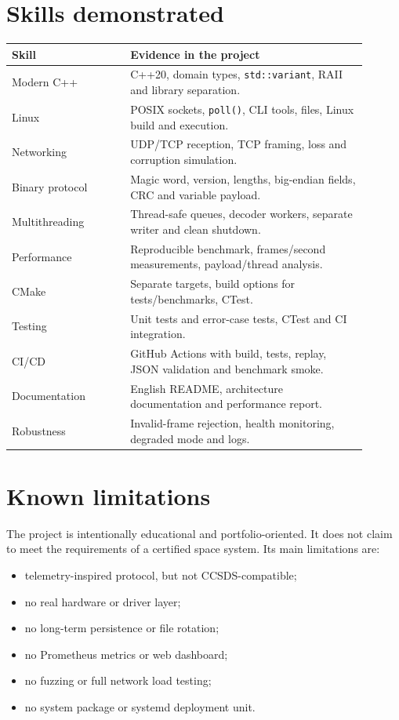 \documentclass[11pt,a4paper]{article}
\newcommand{\code}[1]{\texttt{#1}}
\begin{document}
\section{Skills demonstrated}

\begin{longtable}{p{0.30\linewidth} p{0.60\linewidth}}
\toprule
\textbf{Skill} & \textbf{Evidence in the project} \\
\midrule
Modern C++ & C++20, domain types, \code{std::variant}, RAII and library separation. \\
Linux & POSIX sockets, \code{poll()}, CLI tools, files, Linux build and execution. \\
Networking & UDP/TCP reception, TCP framing, loss and corruption simulation. \\
Binary protocol & Magic word, version, lengths, big-endian fields, CRC and variable payload. \\
Multithreading & Thread-safe queues, decoder workers, separate writer and clean shutdown. \\
Performance & Reproducible benchmark, frames/second measurements, payload/thread analysis. \\
CMake & Separate targets, build options for tests/benchmarks, CTest. \\
Testing & Unit tests and error-case tests, CTest and CI integration. \\
CI/CD & GitHub Actions with build, tests, replay, JSON validation and benchmark smoke. \\
Documentation & English README, architecture documentation and performance report. \\
Robustness & Invalid-frame rejection, health monitoring, degraded mode and logs. \\
\bottomrule
\end{longtable}

\section{Known limitations}

The project is intentionally educational and portfolio-oriented. It does not claim to meet the requirements of a certified space system. Its main limitations are:

\begin{itemize}[nosep]
    \item telemetry-inspired protocol, but not CCSDS-compatible;
    \item no real hardware or driver layer;
    \item no long-term persistence or file rotation;
    \item no Prometheus metrics or web dashboard;
    \item no fuzzing or full network load testing;
    \item no system package or systemd deployment unit.
\end{itemize}
\end{document}
